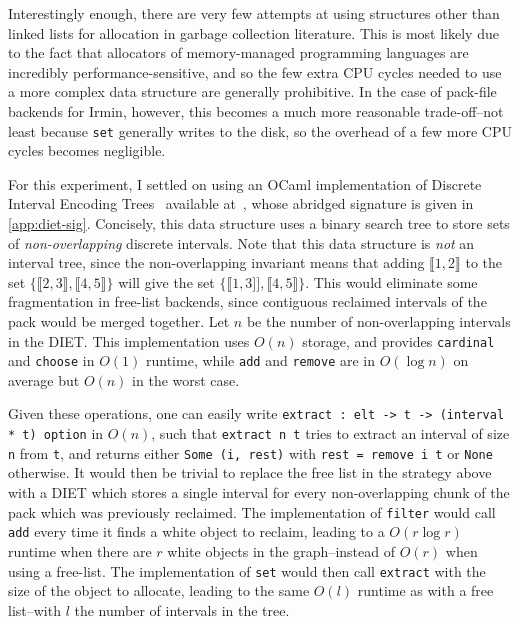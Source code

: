 Interestingly enough, there are very few attempts at using structures other than linked lists for allocation in garbage collection literature. This is most likely due to the fact that allocators of memory-managed programming languages are incredibly performance-sensitive, and so the few extra CPU cycles needed to use a more complex data structure are generally prohibitive. In the case of pack-file backends for Irmin, however, this becomes a much more reasonable trade-off--not least because \texttt{set} generally writes to the disk, so the overhead of a few more CPU cycles becomes negligible.

\bigskip
For this experiment, I settled on using an OCaml implementation of Discrete Interval Encoding Trees~\cite{erwig89} available at~\cite{diet-github}, whose abridged signature is given in \cref{app:diet-sig}. Concisely, this data structure uses a binary search tree to store sets of \emph{non-overlapping} discrete intervals. Note that this data structure is \emph{not} an interval tree, since the non-overlapping invariant means that adding \(\llbracket 1, 2 \rrbracket\) to the set \(\{\llbracket2, 3\rrbracket, \llbracket4, 5\rrbracket\}\) will give the set \(\{\llbracket1, 3]], \llbracket4, 5\rrbracket\}\). This would eliminate some fragmentation in free-list backends, since contiguous reclaimed intervals of the pack would be merged together. Let \(n\) be the number of non-overlapping intervals in the DIET. This implementation uses \(O(n)\) storage, and provides \texttt{cardinal} and \texttt{choose} in \(O(1)\) runtime, while \texttt{add} and \texttt{remove} are in \(O(\log{n})\) on average but \(O(n)\) in the worst case.

Given these operations, one can easily write \texttt{extract : elt -> t -> (interval * t) option} in \(O(n)\), such that \texttt{extract n t} tries to extract an interval of size \texttt{n} from \texttt{t}, and returns either \texttt{Some (i, rest)} with \texttt{rest = remove i t} or \texttt{None} otherwise. It would then be trivial to replace the free list in the strategy above with a DIET which stores a single interval for every non-overlapping chunk of the pack which was previously reclaimed. The implementation of \texttt{filter} would call \texttt{add} every time it finds a white object to reclaim, leading to a \(O(r \log{r})\) runtime when there are \(r\) white objects in the graph--instead of \(O(r)\) when using a free-list. The implementation of \texttt{set} would then call \texttt{extract} with the size of the object to allocate, leading to the same \(O(l)\) runtime as with a free list--with \(l\) the number of intervals in the tree.

